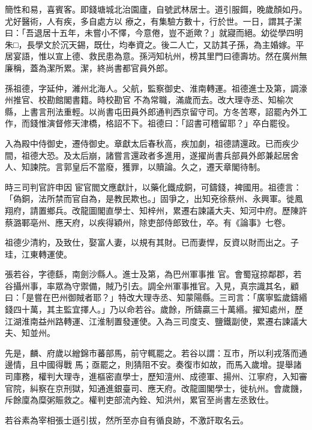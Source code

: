 \begin{pinyinscope}
 簡性和易，喜賓客。即錢塘城北治園廬，自號武林居士。道引服餌，晚歲顏如丹。尤好醫術，人有疾，多自處方以
 療之，有集驗方數十，行於世。一日，謂其子潔曰：「吾退居十五年，未嘗小不懌，今意倦，豈不逝歟？」就寢而絕。幼從學四明朱□，長學文於沉天錫，既仕，均奉資之。後二人亡，又訪其子孫，為主婚嫁。平居宴語，惟以宣上德、救民患為意。孫沔知杭州，榜其里門曰德壽坊。然在廣州無廉稱，蓋為潔所累。潔，終尚書都官員外郎。



 孫祖德，字延仲，濰州北海人。父航，監察御史、淮南轉運。祖德進士及第，調濠州推官、校勘館閣書籍。時校勘官
 不為常職，滿歲而去。改大理寺丞、知榆次縣，上書言刑法重輕。以尚書屯田員外郎通判西京留守司。方冬苦寒，詔罷內外工作，而錢惟演督修天津橋，格詔不下。祖德曰：「詔書可稽留耶？」卒白罷役。



 入為殿中侍御史，遷侍御史。章獻太后春秋高，疾加劇，祖德請還政。已而疾少間，祖德大恐。及太后崩，諸嘗言還政者多進用，遂擢尚書兵部員外郎兼起居舍人、知諫院。言郭皇后不當廢，獲罪，以贖論。久之，遷天章閣待制。



 時三司判官許申因
 宦官閻文應獻計，以藥化鐵成銅，可鑄錢，裨國用。祖德言：「偽銅，法所禁而官自為，是教民欺也。」固爭之，出知兗徐蔡州、永興軍。徙鳳翔府，請置鄉兵。改龍圖閣直學士、知梓州，累遷右諫議大夫、知河中府。歷陳許蔡潞鄆亳州、應天府，以疾得穎州，除吏部侍郎致仕，卒。有《論事》七卷。



 祖德少清約，及致仕，娶富人妻，以規有其財。已而妻悍，反資以財而出之。子珪，江東轉運使。



 張若谷，字德繇，南劍沙縣人。進士及第，為巴州軍事推
 官。會蜀寇掠鄰郡，若谷攝州事，率眾為守禦備，賊乃引去。調全州軍事推官。入見，真宗識其名，顧曰：「是嘗在巴州御賊者耶？」特改大理寺丞、知蒙陽縣。三司言：「廣寧監歲鑄緡錢四十萬，其主監宜擇人。」乃以命若谷。歲餘，所鑄贏三十萬緡。擢知處州，歷江湖淮南益州路轉運、江淮制置發運使。入為三司度支、鹽鐵副使，累遷右諫議大夫、知並州。



 先是，麟、府歲以繒錦市蕃部馬，前守輒罷之。若谷以謂：互市，所以利戎落而通邊情，且中國得戰
 馬；亟罷之，則猜阻不安。奏復市如故，而馬入歲增。提舉諸司庫務，權判大理寺，進樞密直學士，歷知澶州、成德軍、揚州、江寧府，入知審官院，糾察在京刑獄，知通進銀臺司、應天府。改龍圖閣學士，徙杭州。會歲饑，斥餘廩為糜粥賑救之。權判吏部流內銓、知洪州，累官至尚書左丞致仕。



 若谷素為宰相張士遜引拔，然所至亦自有循良跡，不激訐取名云。




\end{pinyinscope}
